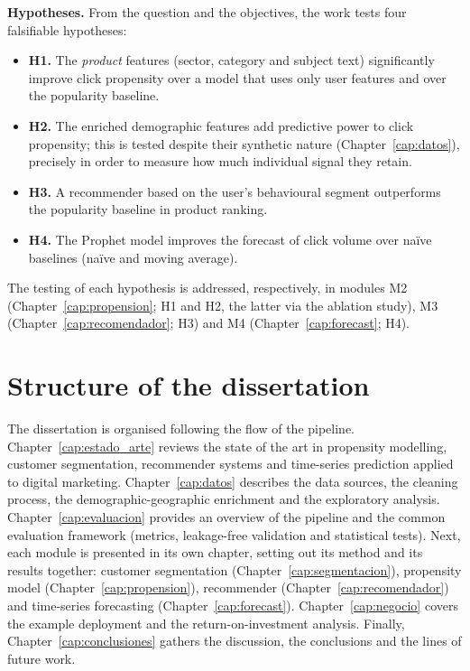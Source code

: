 \medskip
\noindent\textbf{Hypotheses.} From the question and the objectives, the work tests four falsifiable hypotheses:
\begin{itemize}
    \item \textbf{H1.} The \emph{product} features (sector, category and subject text) significantly improve click propensity over a model that uses only user features and over the popularity baseline.
    \item \textbf{H2.} The enriched demographic features add predictive power to click propensity; this is tested despite their synthetic nature (Chapter~\ref{cap:datos}), precisely in order to measure how much individual signal they retain.
    \item \textbf{H3.} A recommender based on the user's behavioural segment outperforms the popularity baseline in product ranking.
    \item \textbf{H4.} The Prophet model improves the forecast of click volume over naïve baselines (naïve and moving average).
\end{itemize}
The testing of each hypothesis is addressed, respectively, in modules M2 (Chapter~\ref{cap:propension}; H1 and H2, the latter via the ablation study), M3 (Chapter~\ref{cap:recomendador}; H3) and M4 (Chapter~\ref{cap:forecast}; H4).

\section{Structure of the dissertation}

The dissertation is organised following the flow of the pipeline. Chapter~\ref{cap:estado_arte} reviews the state of the art in propensity modelling, customer segmentation, recommender systems and time-series prediction applied to digital marketing. Chapter~\ref{cap:datos} describes the data sources, the cleaning process, the demographic-geographic enrichment and the exploratory analysis. Chapter~\ref{cap:evaluacion} provides an overview of the pipeline and the common evaluation framework (metrics, leakage-free validation and statistical tests). Next, each module is presented in its own chapter, setting out its method and its results together: customer segmentation (Chapter~\ref{cap:segmentacion}), propensity model (Chapter~\ref{cap:propension}), recommender (Chapter~\ref{cap:recomendador}) and time-series forecasting (Chapter~\ref{cap:forecast}). Chapter~\ref{cap:negocio} covers the example deployment and the return-on-investment analysis. Finally, Chapter~\ref{cap:conclusiones} gathers the discussion, the conclusions and the lines of future work.

